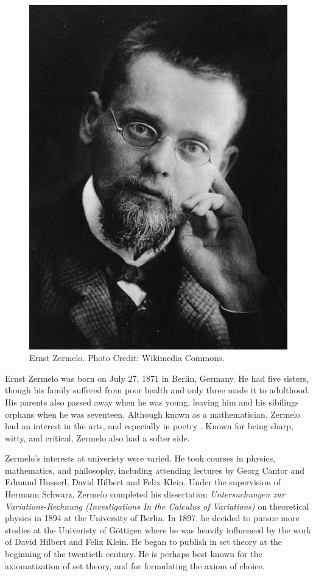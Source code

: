 \documentclass[../../../include/open-logic-section]{subfiles}
\begin{document}

\begin{figure}[h!] 
\centering
\includegraphics[scale=0.5]{ernst-zermelo.jpg} 
\caption{Ernst Zermelo. Photo Credit: Wikimedia Commons.} 
\end{figure}
Ernst Zermelo was born on July 27, 1871 in Berlin, Germany. He had five sisters,
though his family suffered from poor health and only three made it to adulthood. 
His parents also passed away when he was young, leaving him and his sibilings
orphans when he was seventeen. Although known
as a mathematician, Zermelo had an interest in the arts, and especially in poetry
\citep[5]{ebbinghaus2015}. Known for being 
sharp, witty, and critical, Zermelo also had a softer side. 


Zermelo's interests at univeristy were varied. He took courses in physics, 
mathematics, and philosophy, including attending lectures by Georg Cantor
and Edmund Husserl, David Hilbert and Felix Klein. Under the supervision of Hermann Schwarz, Zermelo
completed his dissertation
\emph{Untersuchungen zur Variations-Rechnung (Investigations
In the Calculus of Variations)} on theoretical physics in 1894 at the University of Berlin.
In 1897, he decided to pursue more studies at the Univeristy of G\"{o}ttigen where he
was heavily influenced by the work of David Hilbert and Felix Klein. He began to publish 
in set theory at the beginning of the twentieth century. He is perhaps best known for
 the axiomatization of set theory, and for formulating the axiom of choice.
 
\end{document}
